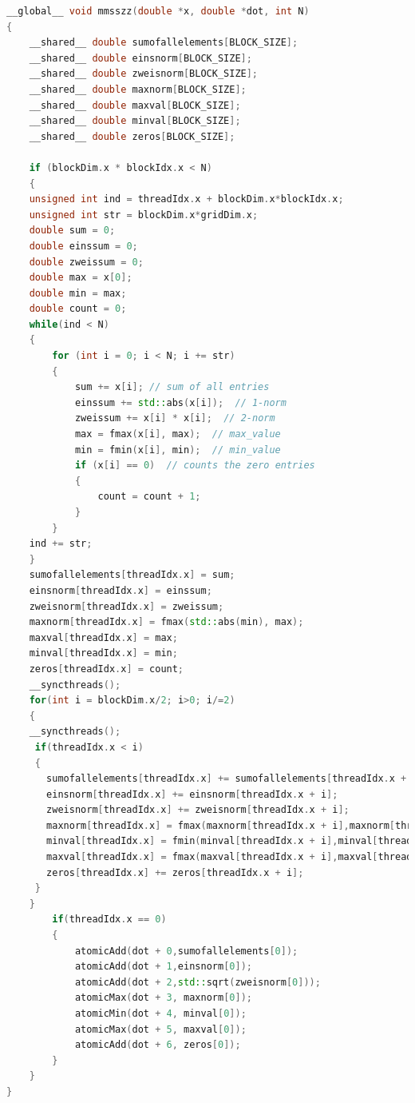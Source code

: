 \documentclass[11pt,a4paper]{article}
\begin{document}
\begin{lstlisting}[language=C++, caption={kernel for the seven operations}]
__global__ void mmsszz(double *x, double *dot, int N)
{
	__shared__ double sumofallelements[BLOCK_SIZE];
	__shared__ double einsnorm[BLOCK_SIZE];
	__shared__ double zweisnorm[BLOCK_SIZE];
	__shared__ double maxnorm[BLOCK_SIZE];
	__shared__ double maxval[BLOCK_SIZE];
	__shared__ double minval[BLOCK_SIZE];
	__shared__ double zeros[BLOCK_SIZE];
	
	if (blockDim.x * blockIdx.x < N)
	{
	unsigned int ind = threadIdx.x + blockDim.x*blockIdx.x;
	unsigned int str = blockDim.x*gridDim.x;
	double sum = 0;
	double einssum = 0;
	double zweissum = 0;
	double max = x[0];
	double min = max;
	double count = 0;
	while(ind < N)
	{
		for (int i = 0; i < N; i += str) 
		{
			sum += x[i]; // sum of all entries
			einssum += std::abs(x[i]);  // 1-norm
			zweissum += x[i] * x[i];  // 2-norm
			max = fmax(x[i], max);  // max_value
			min = fmin(x[i], min);  // min_value
			if (x[i] == 0)  // counts the zero entries
			{
				count = count + 1;
			}
		}
	ind += str;
	}
	sumofallelements[threadIdx.x] = sum;
	einsnorm[threadIdx.x] = einssum;
	zweisnorm[threadIdx.x] = zweissum;
	maxnorm[threadIdx.x] = fmax(std::abs(min), max);
	maxval[threadIdx.x] = max;
	minval[threadIdx.x] = min;
	zeros[threadIdx.x] = count;
	__syncthreads();
	for(int i = blockDim.x/2; i>0; i/=2)
	{
	__syncthreads();
	 if(threadIdx.x < i)
	 {
       sumofallelements[threadIdx.x] += sumofallelements[threadIdx.x + i];
       einsnorm[threadIdx.x] += einsnorm[threadIdx.x + i];
       zweisnorm[threadIdx.x] += zweisnorm[threadIdx.x + i];
       maxnorm[threadIdx.x] = fmax(maxnorm[threadIdx.x + i],maxnorm[threadIdx.x]);
       minval[threadIdx.x] = fmin(minval[threadIdx.x + i],minval[threadIdx.x]); 
       maxval[threadIdx.x] = fmax(maxval[threadIdx.x + i],maxval[threadIdx.x]); 
       zeros[threadIdx.x] += zeros[threadIdx.x + i];
	 }
	}
		if(threadIdx.x == 0)
		{
			atomicAdd(dot + 0,sumofallelements[0]);
			atomicAdd(dot + 1,einsnorm[0]);
			atomicAdd(dot + 2,std::sqrt(zweisnorm[0]));
			atomicMax(dot + 3, maxnorm[0]);
			atomicMin(dot + 4, minval[0]);
			atomicMax(dot + 5, maxval[0]);
			atomicAdd(dot + 6, zeros[0]);
		}
	}
}
\end{lstlisting}
\end{document}
